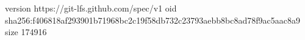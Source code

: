 version https://git-lfs.github.com/spec/v1
oid sha256:f406818af293901b71968bc2c19f58db732c23793aebb8bc8ad78f9ac5aac8a9
size 174916
